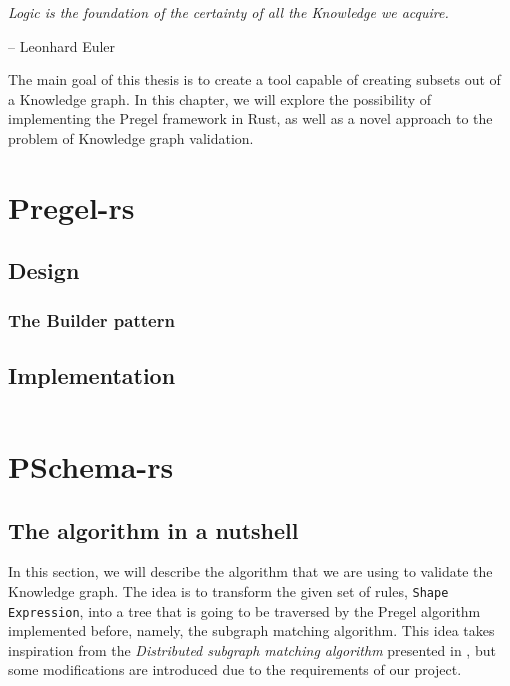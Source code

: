 \epigraph{\textit{Logic is the foundation of the certainty of all the Knowledge we acquire.}}{-- \textup{Leonhard Euler}}

The main goal of this thesis is to create a tool capable of creating subsets out of a Knowledge graph. In this chapter, we will explore the possibility of implementing the Pregel framework in Rust, as well as a novel approach to the problem of Knowledge graph validation.

\section{Pregel-rs}

\subsection{Design}

\subsubsection{The Builder pattern}

\subsection{Implementation}

\begin{code}
    \inputminted{rust}{code/listings/11-1_pregel.rs}
\end{code}

\section{PSchema-rs}

\subsection{The algorithm in a nutshell}

In this section, we will describe the algorithm that we are using to validate the Knowledge graph. The idea is to transform the given set of rules, \texttt{Shape} \texttt{Expression}, into a tree that is going to be traversed by the Pregel algorithm implemented before, namely, the subgraph matching algorithm. This idea takes inspiration from the \textit{Distributed subgraph matching algorithm} presented in \cite{Xu2019}, but some modifications are introduced due to the requirements of our project.

